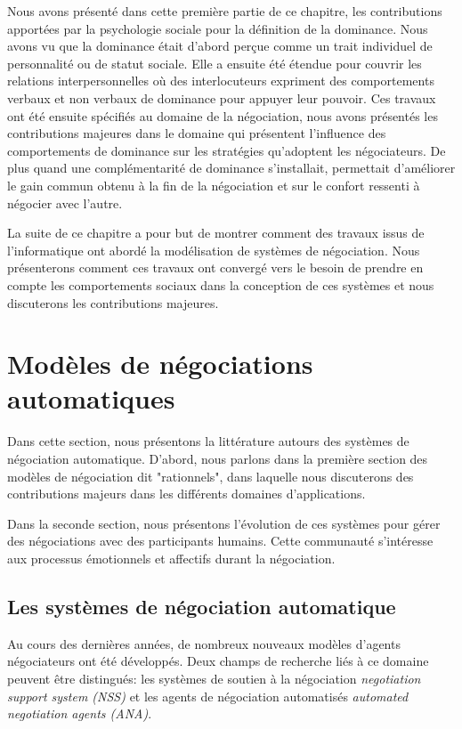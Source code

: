 	
	Nous avons présenté dans cette première partie de ce chapitre, les contributions apportées par la psychologie sociale pour la définition de la dominance. Nous avons vu que la dominance était d'abord perçue comme un trait individuel de personnalité ou de statut sociale. Elle a ensuite été étendue pour couvrir les relations interpersonnelles où des interlocuteurs expriment des comportements verbaux et non verbaux de dominance pour appuyer leur pouvoir. 
	Ces travaux ont été ensuite spécifiés au domaine de la négociation, nous avons présentés les contributions majeures dans le domaine qui présentent l'influence des comportements de dominance sur les stratégies qu'adoptent les négociateurs. De plus quand une complémentarité de dominance s'installait, permettait d'améliorer le gain commun obtenu à la fin de la négociation et sur le confort ressenti à négocier avec l'autre.
	
	
	La suite de ce chapitre a pour but de montrer comment des travaux issus de l'informatique ont abordé la modélisation de systèmes de négociation. Nous présenterons comment ces travaux ont convergé vers le besoin de prendre en compte les comportements sociaux dans la conception de ces systèmes et nous discuterons les contributions majeures.  
	
	
	


	\section{Modèles de négociations automatiques}
		Dans cette section, nous présentons la littérature autours des systèmes de négociation automatique. D'abord, nous parlons dans la première section des modèles de négociation dit "rationnels", dans laquelle nous discuterons des contributions majeurs dans les différents domaines d'applications. 
		
		Dans la seconde section, nous présentons l'évolution de ces systèmes pour gérer des négociations avec des participants humains. Cette communauté s'intéresse aux processus émotionnels et affectifs durant la négociation. 
	
		\subsection{Les systèmes de négociation automatique}	
		Au cours des dernières années, de nombreux nouveaux modèles d'agents négociateurs ont été développés. Deux champs de recherche liés à ce domaine peuvent être distingués: les systèmes de soutien à la négociation \emph{ negotiation support system (NSS)} et les agents de négociation automatisés \emph{automated negotiation agents (ANA)}.
	
